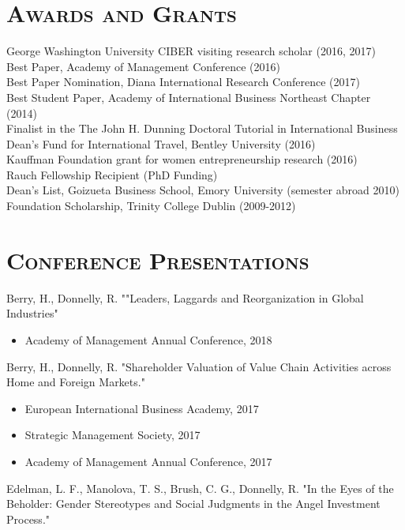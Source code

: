 \documentclass[margin, 12pt]{res}
\begin{document}
\begin{resume}
\section{\normalfont\textsc{Awards and Grants}}
George Washington University CIBER visiting research scholar (2016, 2017) \\[0.2em]
Best Paper, Academy of Management Conference (2016)\\[0.2em]
Best Paper Nomination, Diana International Research Conference (2017)\\[0.2em]
Best Student Paper, Academy of International Business Northeast Chapter (2014)\\[0.2em]
Finalist in the The John H. Dunning Doctoral Tutorial in International Business \\ [0.2em]
Dean's Fund for International Travel, Bentley University (2016) \\
[0.2em]
Kauffman Foundation grant for women entrepreneurship research (2016) \\
[0.2em]
Rauch Fellowship Recipient (PhD Funding) \\
[0.2em]
Dean's List, Goizueta Business School, Emory University (semester abroad 2010)
Foundation Scholarship, Trinity College Dublin (2009-2012) 





\section{\normalfont\textsc{Conference Presentations}}

Berry, H., Donnelly, R. ""Leaders, Laggards and Reorganization in Global
Industries" 
\begin{itemize}
\item Academy of Management Annual Conference, 2018
\end{itemize}
\vspace{-0.25cm}


Berry, H., Donnelly, R. "Shareholder Valuation of Value Chain Activities across Home and Foreign Markets." 
\begin{itemize}
\item European International Business Academy, 2017
\item Strategic Management Society, 2017
\item Academy of Management Annual Conference, 2017
\end{itemize}
\vspace{-0.25cm}
Edelman, L. F., Manolova, T. S., Brush, C. G., Donnelly, R.  "In the Eyes of the Beholder: Gender Stereotypes and Social Judgments in the Angel Investment Process." 
\begin{itemize}


\end{itemize}
\end{resume}
\end{document}
